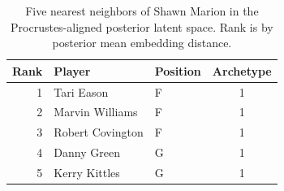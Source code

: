 \begin{table}[htbp]
  \centering\small
  \begin{tabular}{rllc}
    \toprule
    Rank & Player & Position & Archetype \\
    \midrule
    1 & Tari Eason & F & 1 \\
    2 & Marvin Williams & F & 1 \\
    3 & Robert Covington & F & 1 \\
    4 & Danny Green & G & 1 \\
    5 & Kerry Kittles & G & 1 \\
    \bottomrule
  \end{tabular}
  \caption{Five nearest neighbors of Shawn Marion in the Procrustes-aligned posterior latent space. Rank is by posterior mean embedding distance.}
  \label{tab:Shawn_Marion_neighbors}
\end{table}

